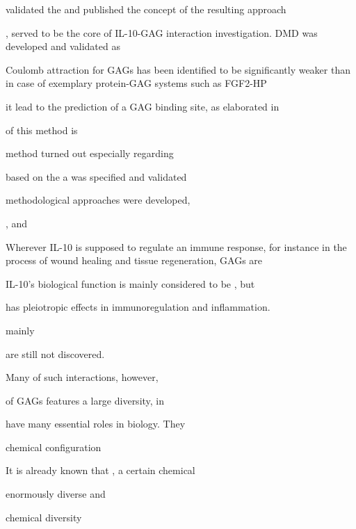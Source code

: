 validated the and published the concept of the resulting approach



, served to be the core
of IL-10-GAG interaction investigation. DMD was developed and validated as







Coulomb attraction for GAGs has been identified to be
significantly weaker than in case of exemplary protein-GAG systems such as
FGF2-HP


it lead to the prediction of a GAG binding site, as elaborated in




of this method is

 method turned out
especially regarding





 based on the a
was specified and validated



methodological approaches were developed,

, and



Wherever IL-10 is supposed to
regulate an immune response, for instance in the process of wound healing and
tissue regeneration, GAGs are


 IL-10's biological function is mainly considered to be
, but

 has pleiotropic effects in immunoregulation and
inflammation.




mainly








are still
not discovered.


Many of such interactions, however,




of GAGs features a
large diversity, in


have many essential roles in biology. They

 chemical
configuration


It is already known that , a certain chemical




enormously diverse and

chemical diversity







